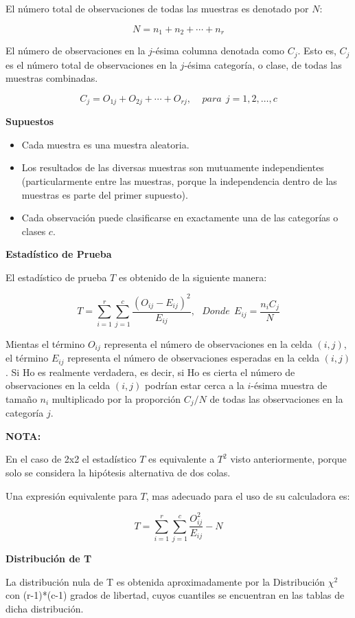 \documentclass[a4paper,oneside,openany]{book}
\begin{document}
El número total de observaciones de todas las muestras es denotado por
\(N\):

\[N=n_{1}+n_{2}+\cdots+n_{r}\]

El número de observaciones en la \(j\)-ésima columna denotada como
\(C_{j}\). Esto es, \(C_{j}\) es el número total de observaciones en la
\(j\)-ésima categoría, o clase, de todas las muestras combinadas.

\[C_{j}=O_{1j}+O_{2j}+\cdots+O_{rj}, \ \ \ \ \ para\ \ j= 1,2,\ldots,c \]

\textbf{Supuestos}

\begin{itemize}
\item
  Cada muestra es una muestra aleatoria.
\item
  Los resultados de las diversas muestras son mutuamente independientes
  (particularmente entre las muestras, porque la independencia dentro de
  las muestras es parte del primer supuesto).
\item
  Cada observación puede clasificarse en exactamente una de las
  categorías o clases \(c\).
\end{itemize}

\textbf{Estadístico de Prueba}

El estadístico de prueba \(T\) es obtenido de la siguiente manera:

\[T=\sum_{i=1}^{r}\sum_{j=1}^{c}\frac{(O_{ij}-E_{ij})^2}{E_{ij}}, \ \ \ Donde\ \ E_{ij}=\frac{n_{i}C_{j}}{N}\]

Mientas el término \(O_{ij}\) representa el número de observaciones en
la celda \((i,j)\), el término \(E_{ij}\) representa el número de
observaciones esperadas en la celda \((i,j)\). Si Ho es realmente
verdadera, es decir, si Ho es cierta el número de observaciones en la
celda \((i,j)\) podrían estar cerca a la \(i\)-ésima muestra de tamaño
\(n_{i}\) multiplicado por la proporción \(C_{j}/N\) de todas las
observaciones en la categoría \(j\).

\textbf{NOTA:}

En el caso de 2x2 el estadístico \(T\) es equivalente a \(T^2\) visto
anteriormente, porque solo se considera la hipótesis alternativa de dos
colas.

Una expresión equivalente para \(T\), mas adecuado para el uso de su
calculadora es:

\[T=\sum_{i=1}^{r}\sum_{j=1}^{c}\frac{O_{ij}^{2}}{E_{ij}}-N\]

\textbf{Distribución de T}

La distribución nula de T es obtenida aproximadamente por la
Distribución \(\chi^2\) con (r-1)*(c-1) grados de libertad, cuyos
cuantiles se encuentran en las tablas de dicha distribución.
\end{document}
